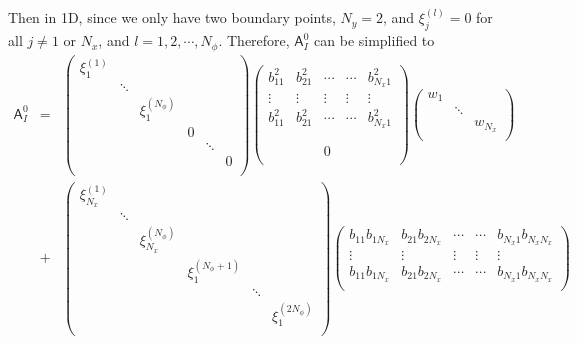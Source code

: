 \documentclass[english,reqno]{amsart}
\theoremstyle{plain}
\theoremstyle{definition} %
\newcommand{\Amat}{\mathsf{A}}
\begin{document}
Then in 1D, since we only have two boundary points, $N_y = 2$, and $\xi_j^{(l)} = 0$ for all $j \neq 1$ or $N_x$, and $l= 1, 2, \cdots, N_\phi$. Therefore, $\Amat_I^0$ can be simplified to 
\begin{eqnarray*}
\Amat_I^0  &= & 
\begin{pmatrix} 
\xi_1^{(1)} &    &  &   \\
  & \ddots &   &   & \\
 &  &  \xi_1^{(N_\phi)}  & &  \\
 &  &   &  0  & & \\
  &  &   &    &  \ddots& \\
    &  &   &    &  & 0 \\
\end{pmatrix}
 \begin{pmatrix}
b_{11}^2   &   b_{21}^2    &   \cdots  & \cdots  & b_{N_x1}^2 \\
 \vdots      &   \vdots        &    \vdots  &  \vdots  &   \vdots  \\
b_{11}^2  &     b_{21}^2  &     \cdots  & \cdots  &   b_{N_x1}^2 \\
&  &  &  & \\
 &  &  &  & \\
 &  &0  &  & \\
 &  &    &  &
\end{pmatrix} 
\begin{pmatrix}
w_1 &   &   \\
  & \ddots &  \\
&  & w_{N_x} \\
\end{pmatrix}  
\\
&+ &
\begin{pmatrix} 
\xi_{N_x}^{(1)} &    &  &   \\
  & \ddots &   &   & \\
 &  &  \xi_{N_x}^{(N_\phi)}  & &  \\
 &  &   &  \xi_1^{(N_\phi+1)}  & & \\
  &  &   &    &  \ddots& \\
    &  &   &    &  & \xi_1^{(2N_\phi)} \\
\end{pmatrix}
 \begin{pmatrix}
b_{11} b_{1N_x}   &   b_{21}b_{2N_x}    &   \cdots  & \cdots  & b_{N_x1}b_{N_xN_x} \\
 \vdots      &   \vdots        &    \vdots  &  \vdots  &   \vdots  \\
b_{11} b_{1N_x}  &      b_{21}b_{2N_x}    &   \cdots  & \cdots  & b_{N_x1}b_{N_xN_x}\\

\end{pmatrix}
\end{eqnarray*}
\end{document}

